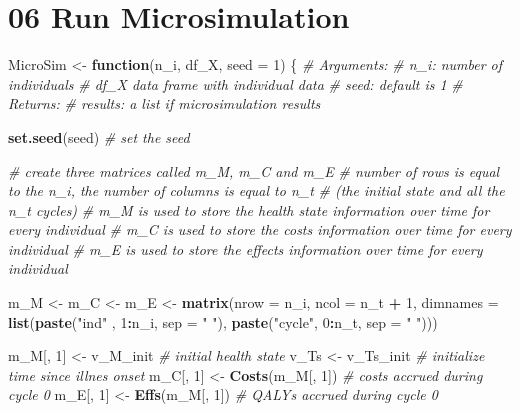 \documentclass[
]{article}
\newenvironment{Shaded}{\begin{snugshade}}{\end{snugshade}}
\newcommand{\CommentTok}[1]{\textcolor[rgb]{0.56,0.35,0.01}{\textit{#1}}}
\newcommand{\ControlFlowTok}[1]{\textcolor[rgb]{0.13,0.29,0.53}{\textbf{#1}}}
\newcommand{\DataTypeTok}[1]{\textcolor[rgb]{0.13,0.29,0.53}{#1}}
\newcommand{\DecValTok}[1]{\textcolor[rgb]{0.00,0.00,0.81}{#1}}
\newcommand{\KeywordTok}[1]{\textcolor[rgb]{0.13,0.29,0.53}{\textbf{#1}}}
\newcommand{\NormalTok}[1]{#1}
\newcommand{\OperatorTok}[1]{\textcolor[rgb]{0.81,0.36,0.00}{\textbf{#1}}}
\newcommand{\StringTok}[1]{\textcolor[rgb]{0.31,0.60,0.02}{#1}}
\begin{document}
\hypertarget{run-microsimulation}{%
\section{06 Run Microsimulation}\label{run-microsimulation}}

\begin{Shaded}
\begin{Highlighting}[]
\NormalTok{MicroSim <-}\StringTok{ }\ControlFlowTok{function}\NormalTok{(n_i, df_X, }\DataTypeTok{seed =} \DecValTok{1}\NormalTok{) \{}
  \CommentTok{# Arguments:  }
    \CommentTok{# n_i:     number of individuals}
    \CommentTok{# df_X     data frame with individual data }
    \CommentTok{# seed: default is 1}
  \CommentTok{# Returns:}
    \CommentTok{# results: a list if microsimulation results}
  
  \KeywordTok{set.seed}\NormalTok{(seed) }\CommentTok{# set the seed}
  
  \CommentTok{# create three matrices called m_M, m_C and m_E}
  \CommentTok{# number of rows is equal to the n_i, the number of columns is equal to n_t }
  \CommentTok{# (the initial state and all the n_t cycles)}
  \CommentTok{# m_M is used to store the health state information over time for every individual}
  \CommentTok{# m_C is used to store the costs information over time for every individual}
  \CommentTok{# m_E is used to store the effects information over time for every individual}
  
\NormalTok{  m_M <-}\StringTok{ }\NormalTok{m_C <-}\StringTok{ }\NormalTok{m_E <-}\StringTok{  }\KeywordTok{matrix}\NormalTok{(}\DataTypeTok{nrow =}\NormalTok{ n_i, }\DataTypeTok{ncol =}\NormalTok{ n_t }\OperatorTok{+}\StringTok{ }\DecValTok{1}\NormalTok{, }
                                       \DataTypeTok{dimnames =} \KeywordTok{list}\NormalTok{(}\KeywordTok{paste}\NormalTok{(}\StringTok{"ind"}\NormalTok{  , }\DecValTok{1}\OperatorTok{:}\NormalTok{n_i, }\DataTypeTok{sep =} \StringTok{" "}\NormalTok{), }
                                                       \KeywordTok{paste}\NormalTok{(}\StringTok{"cycle"}\NormalTok{, }\DecValTok{0}\OperatorTok{:}\NormalTok{n_t, }\DataTypeTok{sep =} \StringTok{" "}\NormalTok{)))  }
 
\NormalTok{  m_M[, }\DecValTok{1}\NormalTok{] <-}\StringTok{ }\NormalTok{v_M_init          }\CommentTok{# initial health state}
\NormalTok{  v_Ts     <-}\StringTok{ }\NormalTok{v_Ts_init         }\CommentTok{# initialize time since illnes onset}
\NormalTok{  m_C[, }\DecValTok{1}\NormalTok{] <-}\StringTok{ }\KeywordTok{Costs}\NormalTok{(m_M[, }\DecValTok{1}\NormalTok{])   }\CommentTok{# costs accrued during cycle 0}
\NormalTok{  m_E[, }\DecValTok{1}\NormalTok{] <-}\StringTok{ }\KeywordTok{Effs}\NormalTok{(m_M[, }\DecValTok{1}\NormalTok{])    }\CommentTok{# QALYs accrued during cycle 0}
  

\end{Highlighting}
\end{Shaded}
\end{document}
